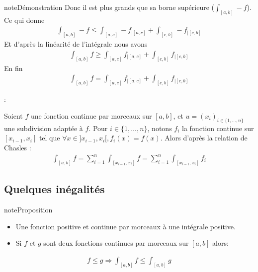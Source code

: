\documentclass[letterpaper,10pt,french]{sphinxmanual}
\begin{document}
\begin{sphinxadmonition}{note}{Démonstration}
\sphinxAtStartPar
Donc il est plus grands que sa borne supérieure (\(\int_{[a, b]} -f\)).
Ce qui donne
\begin{equation*}
\begin{split}
\int_{[a, b]} -f \leq \int_{[a, c]} -f_{|[a, c]} + \int_{[c, b]} -f_{|[c, b]}
\end{split}
\end{equation*}
\sphinxAtStartPar
Et d’après la linéarité de l’intégrale nous avons
\begin{equation*}
\begin{split}
\int_{[a, b]} f \geq \int_{[a, c]} f_{|[a, c]} + \int_{[c, b]} f_{|[c, b]}
\end{split}
\end{equation*}
\sphinxAtStartPar
En fin
\begin{equation*}
\begin{split}
\int_{[a, b]} f = \int_{[a, c]} f_{|[a, c]} + \int_{[c, b]} f_{|[c, b]}
\end{split}
\end{equation*}\end{sphinxadmonition}

\sphinxAtStartPar
{}:

\sphinxAtStartPar
Soient \(f\) une fonction continue par morceaux sur \([a, b]\), et \(u=(x_i)_{i\in\{1,\ldots,n\}}\) une subdivision adaptée à \(f\). Pour \(i \in \{1,\ldots,n\}\), notons \(f_i\) la fonction continue sur \([x_{i-1}, x_i]\) tel que \(\forall x \in ]x_{i-1}, x_i[, f_i(x) = f(x)\). Alors d’après la relation de Chasles :
\begin{equation*}
\begin{split}
\int_{[a, b]} f = \sum_{i=1}^n \int_{[x_{i-1}, x_i]}f = \sum_{i=1}^n \int_{[x_{i-1}, x_i]}f_i
\end{split}
\end{equation*}

\subsection{Quelques inégalités}
\label{\detokenize{pptint:quelques-inegalites}}
\begin{sphinxadmonition}{note}{Proposition}
\begin{itemize}
\item {} 
\sphinxAtStartPar
Une fonction positive et continue par morceaux à une intégrale positive.

\item {} 
\sphinxAtStartPar
Si \(f\) et \(g\) sont deux fonctions continues par morceaux sur \([a, b]\) alors:

\end{itemize}
\begin{equation*}
\begin{split}
f \leq g \Rightarrow \int_{[a, b]}f \leq \int_{[a, b]}g 
\end{split}
\end{equation*}\end{sphinxadmonition}
\end{document}
